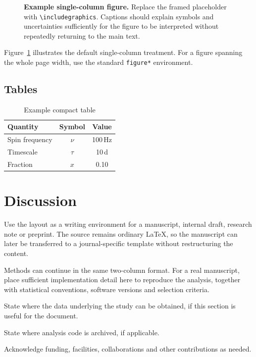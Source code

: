\documentclass[10pt,a4paper,twocolumn]{article}
\begin{document}
\begin{figure}[t]
  \centering
  \fbox{\rule{0pt}{35mm}\rule{0.94\columnwidth}{0pt}}
  \caption{\textbf{Example single-column figure.} Replace the framed placeholder with \texttt{\textbackslash includegraphics}. Captions should explain symbols and uncertainties sufficiently for the figure to be interpreted without repeatedly returning to the main text.}
  \label{fig:example}
\end{figure}

Figure~\ref{fig:example} illustrates the default single-column treatment. For a figure spanning the whole page width, use the standard \texttt{figure*} environment.

\subsection{Tables}
\begin{table}[t]
  \caption{Example compact table}
  \centering
  \begin{tabular}{lcc}
    \toprule
    Quantity & Symbol & Value \\
    \midrule
    Spin frequency & $\nu$ & 100\,Hz \\
    Timescale & $\tau$ & 10\,d \\
    Fraction & $x$ & 0.10 \\
    \bottomrule
  \end{tabular}
\end{table}

\section{Discussion}
Use the layout as a writing environment for a manuscript, internal draft, research note or preprint. The source remains ordinary \LaTeX{}, so the manuscript can later be transferred to a journal-specific template without restructuring the content.

\methods
Methods can continue in the same two-column format. For a real manuscript, place sufficient implementation detail here to reproduce the analysis, together with statistical conventions, software versions and selection criteria.

\dataavailability
State where the data underlying the study can be obtained, if this section is useful for the document.

\codeavailability
State where analysis code is archived, if applicable.

\acknowledgements
Acknowledge funding, facilities, collaborations and other contributions as needed.
\end{document}

